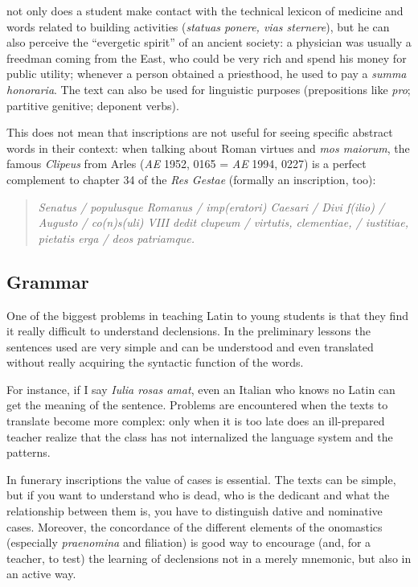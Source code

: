 \documentclass[amsthm,ebook]{saparticle}
\begin{document}
not only does a student make contact with the technical lexicon of medicine and words related to building activities
(\emph{statuas ponere, vias sternere}), but he can also perceive the ``evergetic spirit'' of an ancient society: a physician was
usually a freedman coming from the East, who could be very rich and spend his money for public utility; whenever a
person obtained a priesthood, he used to pay a \emph{summa honoraria}. The text can also be used for linguistic purposes
(prepositions like \emph{pro}; partitive genitive; deponent verbs).

This does not mean that inscriptions are not useful for seeing specific abstract words in their context: when talking
about Roman virtues and \emph{mos maiorum}, the famous \emph{Clipeus} from Arles (\emph{AE} 1952, 0165 = \emph{AE} 1994, 0227) is a
perfect complement to chapter 34 of the \emph{Res Gestae} (formally an inscription, too): \begin{quotation}
\emph{Senatus / populusque Romanus /
imp(eratori) Caesari / Divi f(ilio) / Augusto / co(n)s(uli) VIII dedit clupeum / virtutis, clementiae, / iustitiae,
pietatis erga / deos patriamque.}

\end{quotation}



\subsection{Grammar}
\noindent One of the biggest problems in teaching Latin to young students is that they find it really difficult to understand
declensions. In the preliminary lessons the sentences used are very simple and can be understood and even translated
without really acquiring the syntactic function of the words.

For instance, if I say\emph{ Iulia rosas amat}, even an Italian who knows no Latin can get the meaning of the sentence.
Problems are encountered when the texts to translate become more complex: only when it is too late does
an ill-prepared teacher realize that the class has not internalized the language system and the patterns.

In funerary inscriptions the value of cases is essential. The texts can be simple, but if you want to understand who is
dead, who is the dedicant and what the relationship between them is, you have to distinguish dative and nominative
cases. Moreover, the concordance of the different elements of the onomastics (especially \emph{praenomina} and filiation) is
good way to encourage (and, for a teacher, to test) the learning of declensions not in a merely mnemonic, but also in
an active way.
\end{document}
